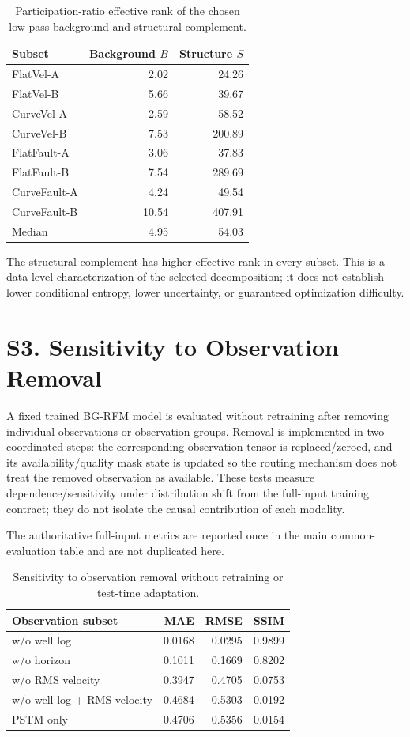 \documentclass[11pt]{article}
\begin{document}
\begin{table}[t]
\centering
\caption{Participation-ratio effective rank of the chosen low-pass background and structural complement.}
\begin{tabular}{lrr}
\toprule
Subset & Background $B$ & Structure $S$ \\
\midrule
FlatVel-A & 2.02 & 24.26 \\
FlatVel-B & 5.66 & 39.67 \\
CurveVel-A & 2.59 & 58.52 \\
CurveVel-B & 7.53 & 200.89 \\
FlatFault-A & 3.06 & 37.83 \\
FlatFault-B & 7.54 & 289.69 \\
CurveFault-A & 4.24 & 49.54 \\
CurveFault-B & 10.54 & 407.91 \\
\midrule
Median & 4.95 & 54.03 \\
\bottomrule
\end{tabular}
\end{table}

The structural complement has higher effective rank in every subset. This is a data-level characterization of the selected decomposition; it does not establish lower conditional entropy, lower uncertainty, or guaranteed optimization difficulty.

\section{S3. Sensitivity to Observation Removal}

A fixed trained BG-RFM model is evaluated without retraining after removing individual observations or observation groups. Removal is implemented in two coordinated steps: the corresponding observation tensor is replaced/zeroed, and its availability/quality mask state is updated so the routing mechanism does not treat the removed observation as available. These tests measure dependence/sensitivity under distribution shift from the full-input training contract; they do not isolate the causal contribution of each modality.

The authoritative full-input metrics are reported once in the main common-evaluation table and are not duplicated here.

\begin{table}[t]
\centering
\caption{Sensitivity to observation removal without retraining or test-time adaptation.}
\begin{tabular}{lrrr}
\toprule
Observation subset & MAE & RMSE & SSIM \\
\midrule
w/o well log & 0.0168 & 0.0295 & 0.9899 \\
w/o horizon & 0.1011 & 0.1669 & 0.8202 \\
w/o RMS velocity & 0.3947 & 0.4705 & 0.0753 \\
w/o well log + RMS velocity & 0.4684 & 0.5303 & 0.0192 \\
PSTM only & 0.4706 & 0.5356 & 0.0154 \\
\bottomrule
\end{tabular}
\end{table}
\end{document}
